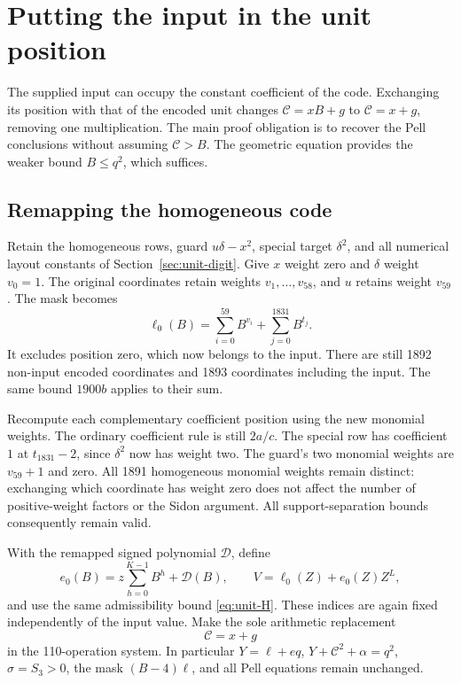 \section{Putting the input in the unit position}\label{sec:input-unit}

The supplied input can occupy the constant coefficient of the code.
Exchanging its position with that of the encoded unit changes
$\mathcal C=xB+g$ to $\mathcal C=x+g$, removing one multiplication.
The main proof obligation is to recover the Pell conclusions without
assuming $\mathcal C>B$. The geometric equation provides the weaker
bound $B\le q^2$, which suffices.

\subsection{Remapping the homogeneous code}

Retain the homogeneous rows, guard $u\delta-x^2$, special target
$\delta^2$, and all numerical layout constants of
Section~\ref{sec:unit-digit}. Give $x$ weight zero and $\delta$
weight $v_0=1$. The original coordinates retain weights
$v_1,\ldots,v_{58}$, and $u$ retains weight $v_{59}$.
The mask becomes
\[
 \ell_0(B)=\sum_{i=0}^{59}B^{v_i}
                    +\sum_{j=0}^{1831}B^{t_j}.
\]
It excludes position zero, which now belongs to the input.
There are still 1892 non-input encoded coordinates and 1893 coordinates
including the input. The same bound $1900b$ applies to their sum.

Recompute each complementary coefficient position using the new
monomial weights. The ordinary coefficient rule is still $2a/c$.
The special row has coefficient $1$ at $t_{1831}-2$, since
$\delta^2$ now has weight two. The guard's two monomial weights are
$v_{59}+1$ and zero. All 1891 homogeneous monomial weights remain
distinct: exchanging which coordinate has weight zero does not affect
the number of positive-weight factors or the Sidon argument.
All support-separation bounds consequently remain valid.

With the remapped signed polynomial $\mathcal D$, define
\[
 e_0(B)=z\sum_{h=0}^{K-1}B^h+\mathcal D(B),
 \qquad V=\ell_0(Z)+e_0(Z)Z^L,
\]
and use the same admissibility bound \eqref{eq:unit-H}.
These indices are again fixed independently of the input value.
Make the sole arithmetic replacement
\[
 \mathcal C=x+g
\]
in the 110-operation system. In particular $Y=\ell+eq$,
$Y+\mathcal C^2+\alpha=q^2$, $\sigma=S_3>0$, the mask
$(B-4)\ell$, and all Pell equations remain unchanged.

